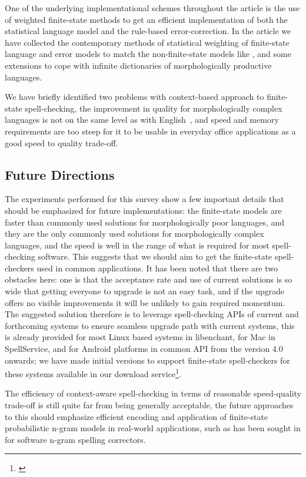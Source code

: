 \documentclass[a4paper,12pt]{article}
\begin{document}
One of the underlying implementational schemes throughout the article is the
use of weighted finite-state methods to get an efficient implementation of both
the statistical language model and the rule-based error-correction. In the
article we have collected the contemporary methods of statistical weighting of
finite-state language and error models to match the non-finite-state models
like \cite{church1991probability}, and some extensions to cope with infinite
dictionaries of morphologically productive languages.

We have briefly identified two problems with context-based approach to
finite-state spell-checking, the improvement in quality for morphologically
complex languages is not on the same level as with
English~\cite{wilcoxohearn2008realword}, and speed and memory requirements
are too steep for it to be usable in everyday office applications as a good
speed to quality trade-off.

\subsection{Future Directions}
\label{subsec:future}

The experiments performed for this survey show a few important details that
should be emphasized for future implementations: the finite-state models are
faster than commonly used solutions for morphologically poor languages, and
they are the only commonly used solutions for morphologically complex
languages, and the speed is well in the range of what is required for most
spell-checking software. This suggests that we should aim to get the
finite-state spell-checkers used in common applications. It has been noted that
there are two obstacles here: one is that the acceptance rate and use of
current solutions is so wide that getting everyone to upgrade is not an easy
task, and if the upgrade offers no visible improvements it will be unlikely to
gain required momentum. The suggested solution therefore is to leverage
spell-checking APIs of current and forthcoming systems to ensure seamless
upgrade path with current systems, this is already provided for most
Linux based systems in libenchant, for Mac in SpellService, and for Android
platforms in common API from the version 4.0 onwards; we have made initial
versions to support finite-state spell-checkers for these systems available in
our download service\footnote{\url{}}.

The efficiency of context-aware spell-checking in terms of reasonable 
speed-quality trade-off is still quite far from being generally acceptable,
the future approaches to this should emphasize efficient encoding and
application of finite-state probabilistic n-gram models in real-world
applications, such as has been sought in \cite{} for software n-gram
spelling correctors.
\end{document}
